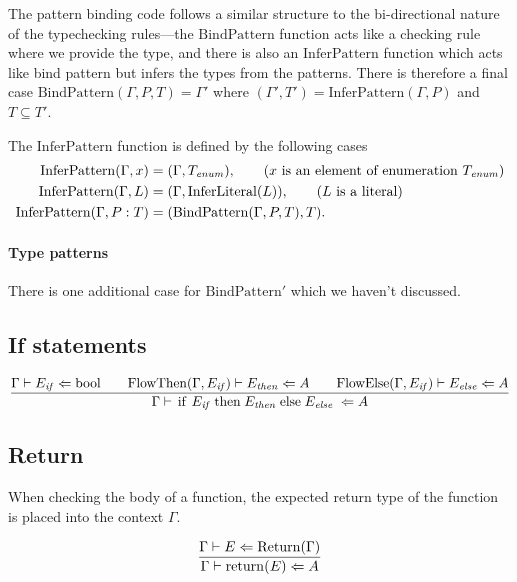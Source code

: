 The pattern binding code follows a similar structure to the
bi-directional nature of the typechecking rules---the
$\mathrm{BindPattern}$ function acts like a checking rule where we
provide the type, and there is also an $\mathrm{InferPattern}$
function which acts like bind pattern but infers the types from the
patterns. There is therefore a final case
$\mathrm{BindPattern}(\Gamma, P, T) = \Gamma'$ where
$(\Gamma', T') = \mathrm{InferPattern}(\Gamma, P)$ and $T \subseteq T'$.

The $\mathrm{InferPattern}$ function is defined by the following cases
\begin{align*}
  \mathrm{InferPattern}(\Gamma,x) &= (\Gamma, T_{\mathit{enum}}), \tag{$x$ is an element of enumeration $T_{\mathit{enum}}$}\\
  \mathrm{InferPattern}(\Gamma,L) &= (\Gamma, \mathrm{InferLiteral}(L)), \tag{$L$ is a literal}\\
  \mathrm{InferPattern}(\Gamma,\msail{$P\;$ : $\;T$}) &= (\mathrm{BindPattern}(\Gamma,P,T), T).
\end{align*}

\paragraph{Type patterns} There is one additional case for $\mathrm{BindPattern}'$ which we haven't discussed. 

\subsection{If statements}

\[
\frac{\tcheck{\Gamma}{E_{\mathit{if}}}{\msail{bool}}
      \qquad
      \tcheck{\mathrm{FlowThen}(\Gamma, E_{\mathit{if}})}{E_{\mathit{then}}}{A}
      \qquad
      \tcheck{\mathrm{FlowElse}(\Gamma, E_{\mathit{if}})}{E_{\mathit{else}}}{A}}
     {\tcheck{\Gamma}{\msail{if $\;E_{\mathit{if}}\;$ then $\;E_{\mathit{then}}\;$ else $\;E_{\mathit{else}}\;$}}{A}}
\]

\subsection{Return}

When checking the body of a function, the expected return type of the
function is placed into the context $\Gamma$.

\[
\frac{\tcheck{\Gamma}{E}{\mathrm{Return}(\Gamma)}}
     {\tcheck{\Gamma}{\msail{return($E$)}}{A}}
\]

